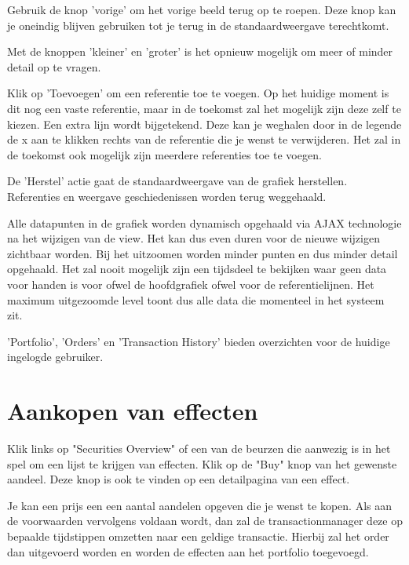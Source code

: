 Gebruik de knop 'vorige' om het vorige beeld terug op te roepen. Deze knop kan je oneindig blijven gebruiken tot je terug in de standaardweergave terechtkomt.

Met de knoppen 'kleiner' en 'groter' is het opnieuw mogelijk om meer of minder detail op te vragen.

Klik op 'Toevoegen' om een referentie toe te voegen. Op het huidige moment is dit nog een vaste referentie, maar in de toekomst zal het mogelijk zijn deze zelf te kiezen. Een extra lijn wordt bijgetekend. Deze kan je weghalen door in de legende de x aan te klikken rechts van de referentie die je wenst te verwijderen.
Het zal in de toekomst ook mogelijk zijn meerdere referenties toe te voegen.

De 'Herstel' actie gaat de standaardweergave van de grafiek herstellen. Referenties en weergave geschiedenissen worden terug weggehaald.

Alle datapunten in de grafiek worden dynamisch opgehaald via AJAX technologie na het wijzigen van de view. Het kan dus even duren voor de nieuwe wijzigen zichtbaar worden. Bij het uitzoomen worden minder punten en dus minder detail opgehaald. Het zal nooit mogelijk zijn een tijdsdeel te bekijken waar geen data voor handen is voor ofwel de hoofdgrafiek ofwel voor de referentielijnen. Het maximum uitgezoomde level toont dus alle data die momenteel in het systeem zit.

'Portfolio', 'Orders' en 'Transaction History' bieden overzichten voor de huidige ingelogde gebruiker.

\section{Aankopen van effecten}

Klik links op "Securities Overview" of een van de beurzen die aanwezig is in het spel om een lijst te krijgen van effecten. Klik op de "Buy" knop van het gewenste aandeel. Deze knop is ook te vinden op een detailpagina van een effect.

Je kan een prijs een een aantal aandelen opgeven die je wenst te kopen. Als aan de voorwaarden vervolgens voldaan wordt, dan zal de transactionmanager deze op bepaalde tijdstippen omzetten naar een geldige transactie. Hierbij zal het order dan uitgevoerd worden en worden de effecten aan het portfolio toegevoegd.